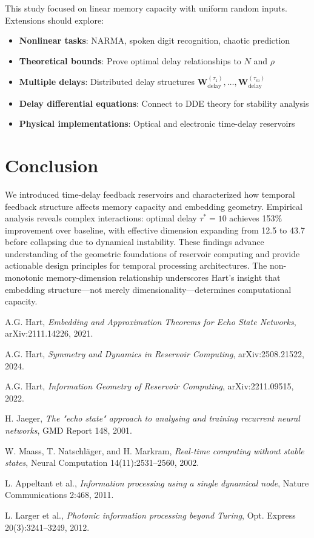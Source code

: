 \documentclass[11pt]{article}
\begin{document}
This study focused on linear memory capacity with uniform random inputs. Extensions should explore:
\begin{itemize}
\item \textbf{Nonlinear tasks}: NARMA, spoken digit recognition, chaotic prediction
\item \textbf{Theoretical bounds}: Prove optimal delay relationships to $N$ and $\rho$
\item \textbf{Multiple delays}: Distributed delay structures $\mathbf{W}_{\text{delay}}^{(\tau_1)}, \ldots, \mathbf{W}_{\text{delay}}^{(\tau_m)}$
\item \textbf{Delay differential equations}: Connect to DDE theory for stability analysis
\item \textbf{Physical implementations}: Optical and electronic time-delay reservoirs
\end{itemize}

\section{Conclusion}

We introduced time-delay feedback reservoirs and characterized how temporal feedback structure affects memory capacity and embedding geometry. Empirical analysis reveals complex interactions: optimal delay $\tau^*=10$ achieves 153\% improvement over baseline, with effective dimension expanding from 12.5 to 43.7 before collapsing due to dynamical instability. These findings advance understanding of the geometric foundations of reservoir computing and provide actionable design principles for temporal processing architectures. The non-monotonic memory-dimension relationship underscores Hart's insight that embedding structure—not merely dimensionality—determines computational capacity.


\begin{thebibliography}{99}

A.G. Hart, \emph{Embedding and Approximation Theorems for Echo State Networks}, arXiv:2111.14226, 2021.

A.G. Hart, \emph{Symmetry and Dynamics in Reservoir Computing}, arXiv:2508.21522, 2024.

A.G. Hart, \emph{Information Geometry of Reservoir Computing}, arXiv:2211.09515, 2022.

H. Jaeger, \emph{The "echo state" approach to analysing and training recurrent neural networks}, GMD Report 148, 2001.

W. Maass, T. Natschläger, and H. Markram, \emph{Real-time computing without stable states}, Neural Computation 14(11):2531–2560, 2002.

L. Appeltant et al., \emph{Information processing using a single dynamical node}, Nature Communications 2:468, 2011.

L. Larger et al., \emph{Photonic information processing beyond Turing}, Opt. Express 20(3):3241–3249, 2012.

\end{thebibliography}
\end{document}
